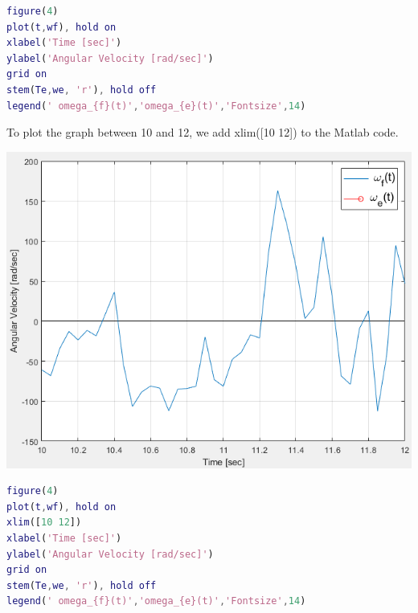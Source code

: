 \documentclass[a4paper,12pt]{article}
\begin{document}
\begin{enumerate}[label={\color{blue}\arabic*)}]
\begin{multicols}{2}
        \columnbreak

        \begin{lstlisting}[style=Matlab-editor,language=Matlab, basicstyle=\small\ttfamily]
figure(4)
plot(t,wf), hold on
xlabel('Time [sec]')
ylabel('Angular Velocity [rad/sec]')
grid on
stem(Te,we, 'r'), hold off
legend(' omega_{f}(t)','omega_{e}(t)','Fontsize',14)
        \end{lstlisting}
    \end{multicols}

    \newpage

    To plot the graph between 10 and 12, we add xlim([10 12]) to the Matlab code.
    \begin{multicols}{2}
        \begin{flushleft}
            \includegraphics[width=0.75\linewidth]{Images/Wf_and_We_Zoomed.png}
            \label{Figure8}
        \end{flushleft}

        \columnbreak

        \begin{lstlisting}[style=Matlab-editor,language=Matlab, basicstyle=\small\ttfamily]
figure(4)
plot(t,wf), hold on
xlim([10 12])
xlabel('Time [sec]')
ylabel('Angular Velocity [rad/sec]')
grid on
stem(Te,we, 'r'), hold off
legend(' omega_{f}(t)','omega_{e}(t)','Fontsize',14)
        \end{lstlisting}
    \end{multicols}


\end{enumerate}
\end{document}
